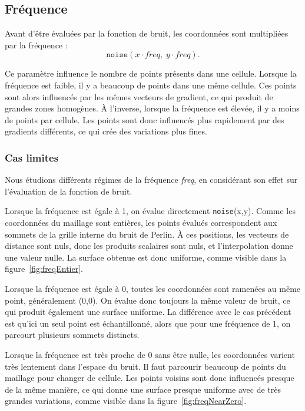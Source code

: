 \subsection{Fréquence}

Avant d’être évaluées par la fonction de bruit, les coordonnées sont multipliées par la fréquence :
\[
\texttt{noise}(x \cdot \textit{freq},\; y \cdot \textit{freq}).
\]

Ce paramètre influence le nombre de points présents dans une cellule.
Lorsque la fréquence est faible, il y a beaucoup de points dans une même cellule. 
Ces points sont alors influencés par les mêmes vecteurs de gradient, ce qui produit de grandes zones homogènes.
À l’inverse, lorsque la fréquence est élevée, il y a moins de points par cellule. Les points sont donc influencés plus rapidement par des gradients différents, ce qui crée des variations plus fines.

\subsubsection{Cas limites}

Nous étudions différents régimes de la fréquence \textit{freq}, en considérant son effet sur l’évaluation de la fonction de bruit.

Lorsque la fréquence est égale à 1, on évalue directement \texttt{noise}(x,y).
Comme les coordonnées du maillage sont entières, les points évalués correspondent aux sommets de la grille interne du bruit de Perlin. 
À ces positions, les vecteurs de distance sont nuls, donc les produits scalaires sont nuls, et l’interpolation donne une valeur nulle.
La surface obtenue est donc uniforme, comme visible dans la figure~\ref{fig:freqEntier}.

Lorsque la fréquence est égale à 0, toutes les coordonnées sont ramenées au même point, généralement (0,0).
On évalue donc toujours la même valeur de bruit, ce qui produit également une surface uniforme. 
La différence avec le cas précédent est qu’ici un seul point est échantillonné, alors que pour une fréquence de 1, on parcourt plusieurs sommets distincts.

Lorsque la fréquence est très proche de 0 sans être nulle, les coordonnées varient très lentement dans l’espace du bruit.
Il faut parcourir beaucoup de points du maillage pour changer de cellule.
Les points voisins sont donc influencés presque de la même manière, ce qui donne une surface presque uniforme avec de très grandes variations, comme visible dans la figure~\ref{fig:freqNearZero}.

